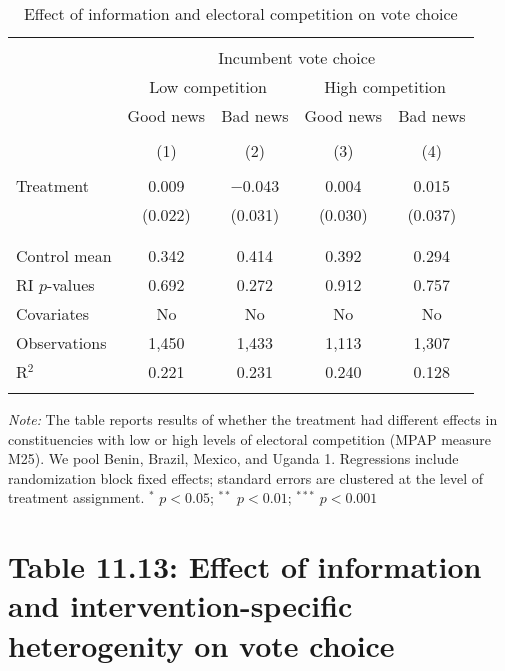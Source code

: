 \documentclass[]{article}
\begin{document}
\begin{table}[!htbp] \centering 
  \caption{Effect of information and electoral competition on vote choice} 
  \label{competition} 
\begin{tabular}{@{\extracolsep{1pt}}lcccc} 
\\[-1.8ex]\hline 
\hline \\[-1.8ex] 
 & \multicolumn{4}{c}{Incumbent vote choice} \\ 
\cline{2-5} 
& \multicolumn{2}{c}{Low competition} &\multicolumn{2}{c}{High competition} \\
\cline{2-5}
 & Good news & Bad news & Good news & Bad news \\ 
\\[-1.8ex] & (1) & (2) & (3) & (4)\\ 
\hline \\[-1.8ex] 
 Treatment & 0.009 & $-$0.043 & 0.004 & 0.015 \\ 
  & (0.022) & (0.031) & (0.030) & (0.037) \\ 
  & & & & \\ 
\hline \\[-1.8ex] 
Control mean & 0.342 & 0.414 & 0.392 & 0.294 \\ 
RI $p$-values & 0.692 & 0.272 & 0.912 & 0.757 \\ 
Covariates & No & No & No & No \\ 
Observations & 1,450 & 1,433 & 1,113 & 1,307 \\ 
R$^{2}$ & 0.221 & 0.231 & 0.240 & 0.128 \\ 
\hline 
\hline \\[-1.8ex] 
\end{tabular} 
\begin{flushleft}\textit{Note:} The table reports results of whether the treatment had different effects in constituencies with low or high levels of electoral competition (MPAP measure M25). We pool Benin, Brazil, Mexico, and Uganda 1. Regressions include randomization block fixed effects; standard errors are clustered at the level of treatment assignment. $^*$ $p<0.05$; $^{**}$ $p<0.01$; $^{***}$ $p<0.001$ \end{flushleft}
\end{table}

\clearpage

\section{Table 11.13: Effect of information and intervention-specific
heterogenity on vote
choice}\label{table-11.13-effect-of-information-and-intervention-specific-heterogenity-on-vote-choice}
\end{document}
